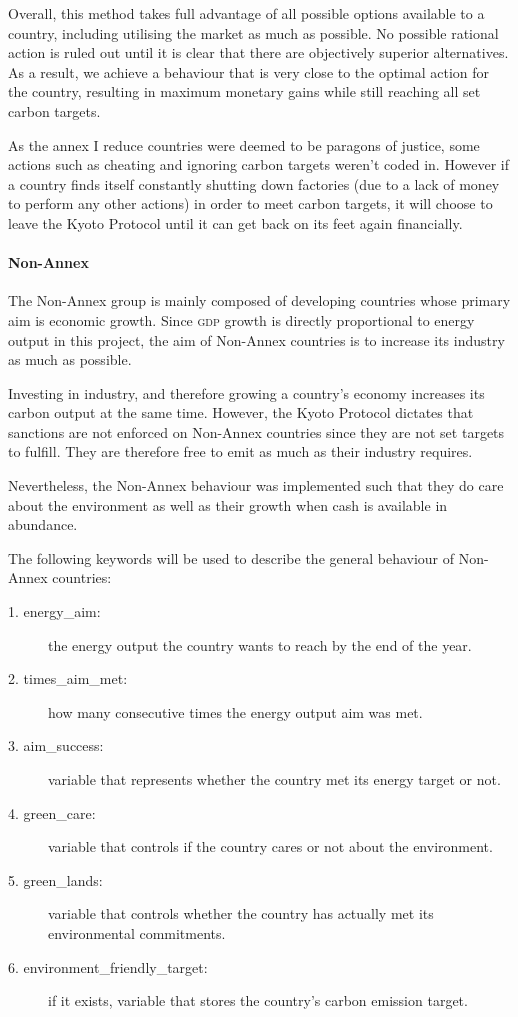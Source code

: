Overall, this method takes full advantage of all possible options available to a country, including utilising the market as much as possible. No possible rational action is ruled out until it is clear that there are objectively superior alternatives. As a result, we achieve a behaviour that is very close to the optimal action for the country, resulting in maximum monetary gains while still reaching all set carbon targets.

As the annex I reduce countries were deemed to be paragons of justice, some actions such as cheating and ignoring carbon targets weren't coded in. However if a country finds itself constantly shutting down factories (due to a lack of money to perform any other actions) in order to meet carbon targets, it will choose to leave the Kyoto Protocol until it can get back on its feet again financially.

\paragraph{Non-Annex}

The Non-Annex group is mainly composed of developing countries whose primary aim is economic growth. Since \textsc{gdp} growth is directly proportional to energy output in this project, the aim of Non-Annex countries is to increase its industry as much as possible. 

Investing in industry, and therefore growing a country's economy increases its carbon output at the same time. However, the Kyoto Protocol dictates that sanctions are not enforced on Non-Annex countries since they are not set targets to fulfill. They are therefore free to emit as much \CO as their industry requires.

Nevertheless, the Non-Annex behaviour was implemented such that they do care about the environment as well as their growth when cash is available in abundance.

The following keywords will be used to describe the general behaviour of Non-Annex countries:

\begin{description}
	\item[1. energy\_aim:] the energy output the country wants to reach by the end of the year.
	\item[2. times\_aim\_met:] how many consecutive times the energy output aim was met.
	\item[3. aim\_success:] variable that represents whether the country met its energy target or not.
	\item[4. green\_care:] variable that controls if the country cares or not about the environment.
	\item[5. green\_lands:] variable that controls whether the country has actually met its environmental commitments.
	\item[6. environment\_friendly\_target:] if it exists, variable that stores the country's carbon emission target. 
\end{description}


